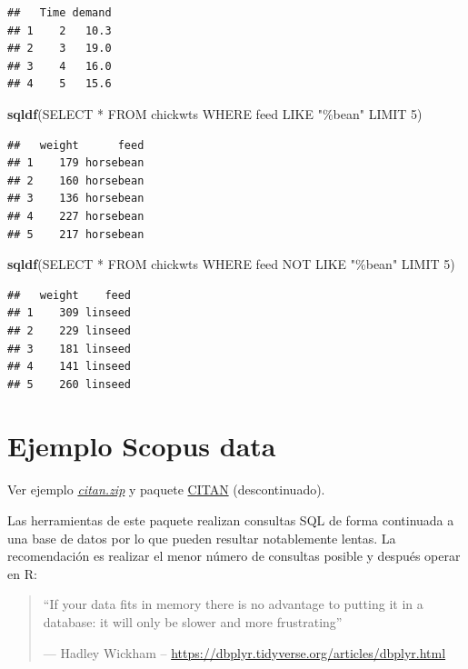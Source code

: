 \documentclass[
]{book}
\newenvironment{Shaded}{\begin{snugshade}}{\end{snugshade}}
\newcommand{\FunctionTok}[1]{\textcolor[rgb]{0.13,0.29,0.53}{\textbf{#1}}}
\newcommand{\NormalTok}[1]{#1}
\newcommand{\StringTok}[1]{\textcolor[rgb]{0.31,0.60,0.02}{#1}}
\theoremstyle{break}
\theoremstyle{nonumberplain}
\begin{document}
\begin{verbatim}
##   Time demand
## 1    2   10.3
## 2    3   19.0
## 3    4   16.0
## 4    5   15.6
\end{verbatim}

\begin{Shaded}
\begin{Highlighting}[]
\FunctionTok{sqldf}\NormalTok{(}\StringTok{\textquotesingle{}SELECT * FROM chickwts WHERE feed LIKE "\%bean" LIMIT 5\textquotesingle{}}\NormalTok{)}
\end{Highlighting}
\end{Shaded}

\begin{verbatim}
##   weight      feed
## 1    179 horsebean
## 2    160 horsebean
## 3    136 horsebean
## 4    227 horsebean
## 5    217 horsebean
\end{verbatim}

\begin{Shaded}
\begin{Highlighting}[]
\FunctionTok{sqldf}\NormalTok{(}\StringTok{\textquotesingle{}SELECT * FROM chickwts WHERE feed NOT LIKE "\%bean" LIMIT 5\textquotesingle{}}\NormalTok{)}
\end{Highlighting}
\end{Shaded}

\begin{verbatim}
##   weight    feed
## 1    309 linseed
## 2    229 linseed
## 3    181 linseed
## 4    141 linseed
## 5    260 linseed
\end{verbatim}

\section{Ejemplo Scopus data}\label{ejemplo-scopus-data}

Ver ejemplo \href{data/citan.zip}{\emph{citan.zip}} y paquete \href{https://cran.r-project.org/web/packages/CITAN/index.html}{CITAN} (descontinuado).

Las herramientas de este paquete realizan consultas SQL de forma continuada a una base de datos por lo que pueden resultar notablemente lentas.
La recomendación es realizar el menor número de consultas posible y después operar en R:

\begin{quote}
``If your data fits in memory
there is no advantage to putting it in a database:
it will only be slower and more frustrating''

--- Hadley Wickham -- \url{https://dbplyr.tidyverse.org/articles/dbplyr.html}
\end{quote}
\end{document}
